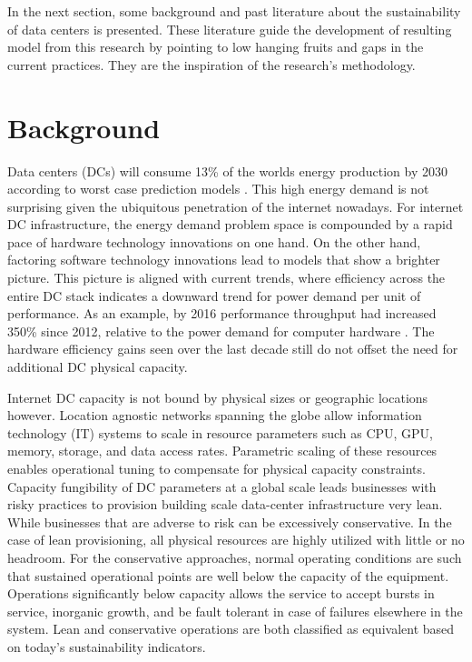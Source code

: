     In the next section, some background and past literature about the sustainability of data centers is presented. These literature guide the development of resulting model from this research by pointing to low hanging fruits and gaps in the current practices. They are the inspiration of the research's methodology. 

\section{Background}

    Data centers (DCs) will consume 13\% of the worlds energy production by 2030 according to worst case prediction models \cite{andrae15}. This high energy demand is not surprising given the ubiquitous penetration of the internet nowadays. For internet DC infrastructure, the energy demand problem space is compounded by a rapid pace of hardware technology innovations on one hand. On the other hand, factoring software technology innovations lead to models that show a brighter picture. This picture is aligned with current trends, where efficiency across the entire DC stack indicates a downward trend for power demand per unit of performance. As an example, by 2016 performance throughput had increased 350\% since 2012, relative to the power demand for computer hardware \cite{GoogleEnvRpt}.  The hardware efficiency gains seen over the last decade still do not offset the need for additional DC physical capacity.
    
    Internet DC capacity is not bound by physical sizes or geographic locations however. Location agnostic networks spanning the globe allow information technology (IT) systems to scale in resource parameters such as CPU, GPU, memory, storage, and data access rates. Parametric scaling of these resources enables operational tuning to compensate for physical capacity constraints. Capacity fungibility of DC parameters at a global scale leads businesses with risky practices to provision building scale data-center infrastructure very lean. While businesses that are adverse to risk can be excessively conservative. In the case of lean provisioning, all physical resources are highly utilized with little or no headroom. For the conservative approaches, normal operating conditions are such that sustained operational points are well below the capacity of the equipment. Operations significantly below capacity allows the service to accept bursts in service, inorganic  growth, and be fault tolerant in case of failures elsewhere in the system. Lean and conservative operations are both classified as equivalent based on today's sustainability indicators.
    
